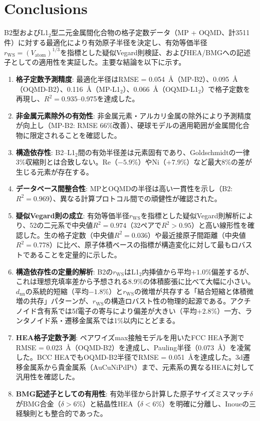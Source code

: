 \documentclass[a4paper,10pt,5p]{elsarticle}
\begin{document}
\section{Conclusions}
B2型およびL1$_2$型二元金属間化合物の格子定数データ（MP + OQMD、計3511件）に対する最適化により有効原子半径を決定し、有効等価半径$r_\mathrm{WS} = (V_\mathrm{atom})^{1/3}$を指標とした疑似Vegard則検証、およびHEA/BMGへの記述子としての適用性を実証した。主要な結論を以下に示す。
\begin{enumerate}
    \item \textbf{格子定数予測精度}: 最適化半径はRMSE = 0.054~\AA（MP-B2）、0.095~\AA（OQMD-B2）、0.116~\AA（MP-L1$_2$）、0.066~\AA（OQMD-L1$_2$）で格子定数を再現し、$R^2 = 0.935$--0.975を達成した。
    \item \textbf{非金属元素除外の有効性}: 非金属元素・アルカリ金属の除外により予測精度が向上し（MP-B2: RMSE 66\%改善）、硬球モデルの適用範囲が金属間化合物に限定されることを確認した。
    \item \textbf{構造依存性}: B2--L1$_2$間の有効半径差は元素固有であり、Goldschmidtの一律3\%収縮則とは合致しない。Re（$-5.9$\%）やNi（$+7.9$\%）など最大8\%の差が生じる元素が存在する。
    \item \textbf{データベース間整合性}: MPとOQMDの半径は高い一貫性を示し（B2: $R^2 = 0.969$）、異なる計算プロトコル間での頑健性が確認された。
    \item \textbf{疑似Vegard則の成立}: 有効等価半径$r_\mathrm{WS}$を指標とした疑似Vegard則解析により、52の二元系で中央値$R^2 = 0.974$（32ペアで$R^2 > 0.95$）と高い線形性を確認した。生の格子定数（中央値$R^2 = 0.036$）や最近接原子間距離（中央値$R^2 = 0.778$）に比べ、原子体積ベースの指標が構造変化に対して最もロバストであることを定量的に示した。
    \item \textbf{構造依存性の定量的解析}: B2の$r_\mathrm{WS}$はL1$_2$内挿値から平均$+1.0$\%偏差するが、これは理想充填率差から予想される8.9\%の体積膨張に比べて大幅に小さい。$d_\mathrm{nn}$の系統的短縮（平均$-1.8$\%）と$r_\mathrm{WS}$の微増が共存する「結合短縮と体積微増の共存」パターンが、$r_\mathrm{WS}$の構造ロバスト性の物理的起源である。アクチノイド含有系では5f電子の寄与により偏差が大きい（平均$+2.8$\%）一方、ランタノイド系・遷移金属系では1\%以内にとどまる。
    \item \textbf{HEA格子定数予測}: ペアワイズmax接触モデルを用いたFCC HEA予測でRMSE = 0.023~\AA（OQMD-B2）を達成し、Pauling半径（0.073~\AA）を凌駕した。BCC HEAでもOQMD-B2半径でRMSE = 0.051~\AA を達成した。3d遷移金属系から貴金属系（AuCuNiPdPt）まで、元素系の異なるHEAに対して汎用性を確認した。
    \item \textbf{BMG記述子としての有用性}: 有効半径から計算した原子サイズミスマッチ$\delta$がBMG合金（$\delta > 6$\%）と結晶性HEA（$\delta < 6$\%）を明確に分離し、Inoueの三経験則とも整合的であった。
\end{enumerate}
\end{document}
